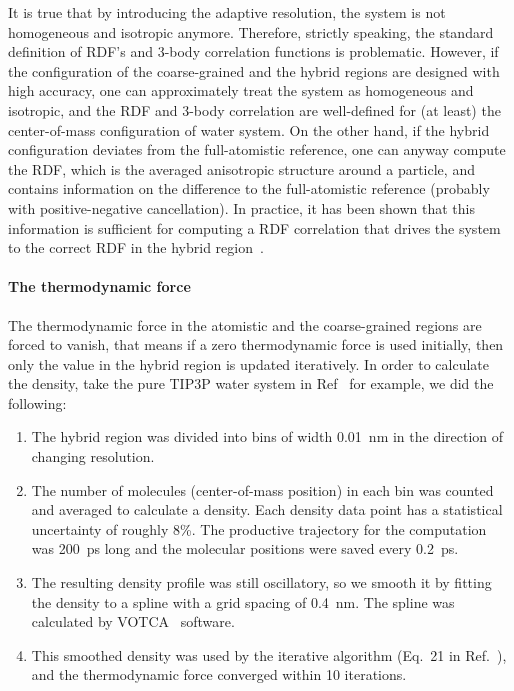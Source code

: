 \documentclass[epjST]{svjour}
\begin{document}
It is true that by introducing the adaptive resolution, the system is not homogeneous
and isotropic anymore. Therefore, strictly speaking, the standard definition
of RDF's and 3-body correlation functions is problematic. However, if the configuration
of the coarse-grained and the
hybrid regions are designed with high accuracy, one can approximately
treat the system as homogeneous and isotropic, and the RDF and 3-body correlation
are well-defined for (at least) the center-of-mass configuration of water system.
On the other hand, if the hybrid
configuration deviates from the full-atomistic reference,
one can anyway compute the RDF,
which is the averaged anisotropic structure around a particle, and contains information on
the difference to the
full-atomistic reference (probably with positive-negative cancellation).
In practice,
it has been shown that this information is sufficient for computing
a RDF correlation that drives the system
to the correct RDF in the hybrid region~\cite{wang2012adaptive,wang2013grand}.



\paragraph{The thermodynamic force}
The thermodynamic force in the atomistic and the coarse-grained
regions are forced to vanish, that means if a zero thermodynamic force
is used initially, then only the value in the hybrid region is updated
iteratively. In order to calculate the density,
take the pure TIP3P water system in Ref~\cite{wang2015adaptive}
for example, we did the following:
\begin{enumerate}
\item The hybrid region was divided into bins of width 0.01~nm in the
  direction of changing resolution.
\item The number of molecules (center-of-mass position) in
  each bin was counted and averaged to calculate a density. Each density data point
  has a statistical uncertainty of roughly 8\%.
  The productive trajectory for the computation was 200~ps long
  and the molecular positions were saved every 0.2~ps.
\item The resulting density profile was still oscillatory,
  so we smooth it by fitting the density
  to a  spline with a grid spacing of 0.4~nm.
  The spline was calculated by VOTCA~\cite{ruehle2009versatile} software.
\item This smoothed density was used
  by the iterative algorithm (Eq.~21 in Ref.~\cite{wang2015adaptive}),
  and the thermodynamic force converged within 10 iterations.
\end{enumerate}
\end{document}
